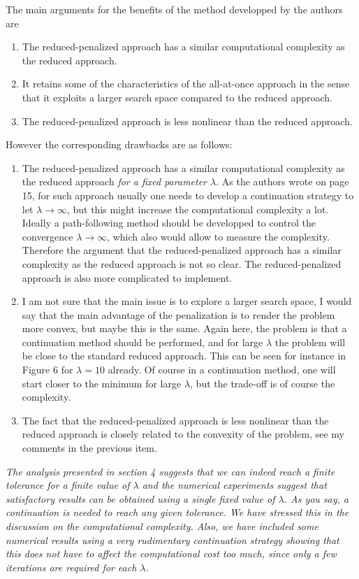 \documentclass[12pt]{article}
\begin{document}
The main arguments for the benefits of the method developped by the authors are 
\begin{enumerate} 
\item The reduced-penalized approach has a similar computational complexity as the reduced approach. 
\item It retains some of the characteristics of the all-at-once approach in the sense that it exploits a larger search space compared to the reduced approach. 
\item The reduced-penalized approach is less nonlinear than the reduced approach. 
\end{enumerate} 
% 
However the corresponding drawbacks are as follows: 
\begin{enumerate} 
\item The reduced-penalized approach has a similar computational complexity as the reduced approach {\it for a fixed parameter $\lambda$}. As the authors wrote on page 15, for such approach usually one needs to develop a continuation strategy to let $\lambda\to\infty$, but this might increase the computational complexity a lot. Ideally a path-following method should be developped to control the convergence $\lambda\to\infty$, which also would allow to measure the complexity. Therefore the argument that the reduced-penalized approach has a similar complexity as the reduced approach is not so clear. The reduced-penalized approach is also more complicated to implement. 
\item I am not sure that the main issue is to explore a larger search space, I would say that the main advantage of the penalization is to render the problem more convex, but maybe this is the same. Again here, the problem is that a continuation method should be performed, and for large $\lambda$ the problem will be close to the standard reduced approach. This can be seen for instance in Figure 6 for $\lambda=10$ already. Of course in a continuation method, one will start closer to the minimum for large $\lambda$, but the trade-off is of course the complexity. 
\item The fact that the reduced-penalized approach is less nonlinear than the reduced approach is closely related to the convexity of the problem, see my comments in the previous item. 
\end{enumerate} 

\vspace{5mm}

\emph{The analysis presented in section 4 suggests that we can indeed reach a finite tolerance for a finite value of $\lambda$ and the numerical experiments suggest that satisfactory results can be obtained using a single fixed value of $\lambda$. As you say,  a continuation is needed to reach any given tolerance. We have stressed this in the discussion on the computational complexity. Also, we have included some numerical results using a very rudimentary continuation strategy showing that this does not have to affect the computational cost too much, since only a few iterations are required for each $\lambda$.}
\end{document}
